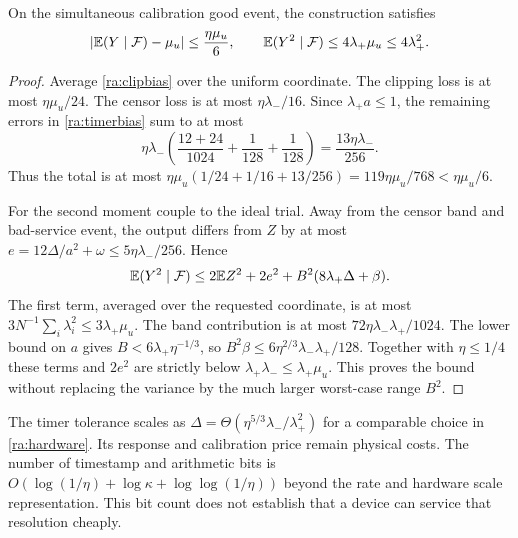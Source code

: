\begin{lemma}
On the simultaneous calibration good event, the construction satisfies
\begin{equation}
 |\mathbb E(Y\mid\mathcal F)-\mu_u|\le\frac{\eta\mu_u}{6},
 \qquad \mathbb E(Y^2\mid\mathcal F)\le4\lambda_+\mu_u
                                      \le4\lambda_+^2.
 \label{ra:trialmoments}
\end{equation}
\end{lemma}
\begin{proof}
Average \eqref{ra:clipbias} over the uniform coordinate. The clipping
loss is at most $\eta\mu_u/24$. The censor loss is at most
$\eta\lambda_-/16$. Since $\lambda_+a\le1$, the remaining errors in
\eqref{ra:timerbias} sum to at most
\[
 \eta\lambda_-\left(\frac{12+24}{1024}
                         +\frac1{128}+\frac1{128}\right)
 =\frac{13\eta\lambda_-}{256}.
\]
Thus the total is at most
$\eta\mu_u(1/24+1/16+13/256)=119\eta\mu_u/768
<\eta\mu_u/6$.

For the second moment couple to the ideal trial. Away from the censor
band and bad-service event, the output differs from $Z$ by at most
$e=12\Delta/a^2+\omega\le5\eta\lambda_-/256$.
Hence
\[
 \mathbb E(Y^2\mid\mathcal F)
 \le2\mathbb E Z^2+2e^2+B^2(8\lambda_+\Delta+\beta).
\]
The first term, averaged over the requested coordinate, is at most
$3N^{-1}\sum_i\lambda_i^2\le3\lambda_+\mu_u$.
The band contribution is at
most $72\eta\lambda_-\lambda_+/1024$.
The lower bound on $a$ gives $B<6\lambda_+\eta^{-1/3}$, so
$B^2\beta\le6\eta^{2/3}\lambda_-\lambda_+/128$.
Together with $\eta\le1/4$ these terms and $2e^2$ are strictly below
$\lambda_+\lambda_-\le\lambda_+\mu_u$.
This proves the bound without replacing the variance
by the much larger worst-case range $B^2$.
\end{proof}

The timer tolerance scales as
$\Delta=\Theta(\eta^{5/3}\lambda_-/\lambda_+^2)$ for a comparable
choice in \eqref{ra:hardware}. Its response and calibration price remain
physical costs. The number of timestamp and arithmetic bits is
$O(\log(1/\eta)+\log\kappa+\log\log(1/\eta))$ beyond the rate and
hardware scale representation. This bit count does not establish that
a device can service that resolution cheaply.

